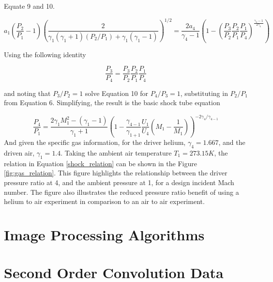 Equate 9 and 10.

\begin{equation}
a_1\left(\frac{P_2}{P_1} - 1\right)\left(\frac{2}{\gamma_1(\gamma_1 + 1)(P_2/P_1) + \gamma_1(\gamma_1 - 1)}\right)^{1/2} = \frac{2a_4}{\gamma_4 - 1}\left(1 - \left(\frac{P_3}{P_2}\frac{P_2}{P_1}\frac{P_1}{P_4}\right)^{\frac{\gamma_4 - 1}{2\gamma_4}}\right)
\end{equation}

Using the following identity

\begin{equation}
\frac{P_3}{P_4}=\frac{P_3}{P_2}\frac{P_2}{P_1}\frac{P_1}{P_4}
\end{equation}

and noting that $P_3/P_2 = 1$ solve Equation 10 for $P_4/P_3 = 1$, substituting in $P_2/P_1$ from Equation 6. Simplifying, the result is the basic shock tube equation

\begin{equation} \label{shock_relation}
\frac{P_4}{P_1} = \frac{2\gamma_1M_1^2 - (\gamma_1 - 1)}{\gamma_1 + 1}\left(1 - \frac{\gamma_{4-1}}{\gamma_{1+1}}\frac{U_1}{U_4}\left(M_1 - \frac{1}{M_1}\right)\right)^{-2\gamma_4/\gamma_{4-1}}
\end{equation}
And given the specific gas information, for the driver helium, $\gamma_4 = 1.667$, and the driven air, $\gamma_1 = 1.4$. Taking the ambient air temperature $T_1 = 273.15K$, the relation in Equation \ref{shock_relation} can be shown in the Figure \ref{fig:gas_relation}. This figure highlights the relationship between the driver pressure ratio at 4, and the ambient pressure at 1, for a design incident Mach number. The figure also illustrates the reduced pressure ratio benefit of using a helium to air experiment in comparison to an air to air experiment. 

\section{Image Processing Algorithms} \label{app:code}

\section{Second Order Convolution Data} \label{app:hessian}
	


